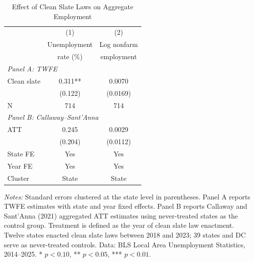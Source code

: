 \begin{table}[H]
\centering
\caption{Effect of Clean Slate Laws on Aggregate Employment}
\begin{threeparttable}
\begin{tabular}{lcc}
\toprule
 & (1) & (2) \\
 & Unemployment & Log nonfarm \\
 & rate (\%) & employment \\
\midrule
\multicolumn{3}{l}{\textit{Panel A: TWFE}} \\
Clean slate & 0.311** & 0.0070 \\
 & (0.122) & (0.0169) \\
N & 714 & 714 \\
\midrule
\multicolumn{3}{l}{\textit{Panel B: Callaway--Sant'Anna}} \\
ATT & 0.245 & 0.0029 \\
 & (0.204) & (0.0112) \\
\midrule
State FE & Yes & Yes \\
Year FE & Yes & Yes \\
Cluster & State & State \\
\bottomrule
\end{tabular}
\begin{tablenotes}[flushleft]
\small
\item \textit{Notes:} Standard errors clustered at the state level in parentheses. Panel A reports TWFE estimates with state and year fixed effects. Panel B reports Callaway and Sant'Anna (2021) aggregated ATT estimates using never-treated states as the control group. Treatment is defined as the year of clean slate law enactment. Twelve states enacted clean slate laws between 2018 and 2023; 39 states and DC serve as never-treated controls. Data: BLS Local Area Unemployment Statistics, 2014--2025. * $p<0.10$, ** $p<0.05$, *** $p<0.01$.
\end{tablenotes}
\end{threeparttable}
\label{tab:main}
\end{table}

